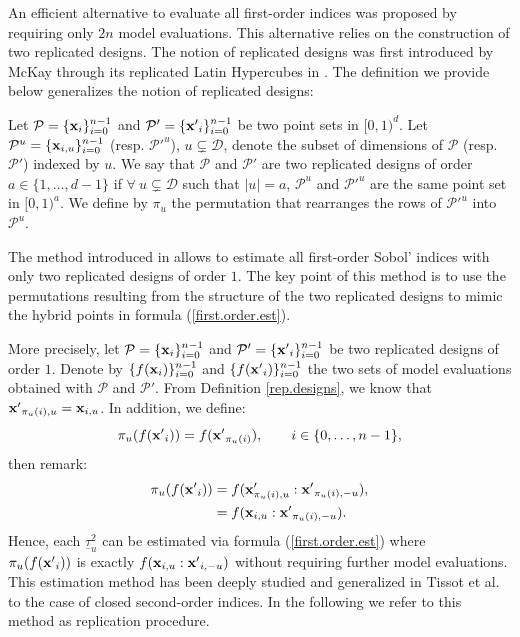 An efficient alternative to evaluate all first-order indices was proposed by \cite{Mara} requiring only $2n$ model evaluations. This alternative relies on the construction of two replicated designs. The notion of replicated designs was first introduced by McKay through its replicated Latin Hypercubes in \cite{McKay}. The definition we provide below generalizes the notion of replicated designs:
\begin{definition}
\label{rep.designs}
Let $\mathcal{P}=\{\boldsymbol{\mathbf{x}}_i\}_{i=0}^{n-1}$ and $\mathcal{P}'=\{{\boldsymbol{\mathbf{x}}'}_i\}_{i=0}^{n-1}$ be two point sets in
$[0,1)^{d}$. Let $\mathcal{P}^u=\{\boldsymbol{\mathbf{x}}_{i,u}\}_{i=0}^{n-1}$ (resp. ${\mathcal{P}'}^u$), $u \subsetneq \mathcal{D}$, denote the subset of dimensions of $\mathcal{P}$ (resp. $\mathcal{P}'$) indexed by $u$. We say that $\mathcal{P}$ and $\mathcal{P}'$ are two replicated designs of order $a \in \{1,\dots,d-1\}$ if $\forall \ u \subsetneq \mathcal{D}$ such that $|u|=a$, $\mathcal{P}^u$ and ${\mathcal{P}'}^u$ are the same point set in $[0,1)^a$. We define by $\pi_u$ the permutation that rearranges the rows of ${\mathcal{P}'}^u$ into $\mathcal{P}^u$.
\end{definition}
The method introduced in \cite{Mara} allows to estimate all first-order Sobol' indices with only two replicated designs of order $1$. The key point of this method is to use the permutations resulting from the structure of the two replicated designs to mimic the hybrid points in formula (\ref{first.order.est}). 

More precisely, let $\mathcal{P}=\{\boldsymbol{\mathbf{x}}_i\}_{i=0}^{n-1}$ and $\mathcal{P}'=\{{\boldsymbol{\mathbf{x}}'}_i\}_{i=0}^{n-1}$ be two replicated designs of order $1$. Denote by $\{f(\boldsymbol{\mathbf{x}}_i)\}_{i=0}^{n-1}$ and $\{f({\boldsymbol{\mathbf{x}}'}_i)\}_{i=0}^{n-1}$ the two sets of model evaluations obtained with $\mathcal{P}$ and $\mathcal{P}'$. From Definition \ref{rep.designs}, we know that ${\boldsymbol{\mathbf{x}}'}_{\pi_u(i),u}={\boldsymbol{\mathbf{x}}}_{i,u}$. In addition, we define:
\[\pi_u(f({\boldsymbol{\mathbf{x}}'}_i)) = f({\boldsymbol{\mathbf{x}}'}_{\pi_u(i)}), \qquad  i \in \{0,\dots,n-1\},\]
then remark:
\begin{align*}
\pi_u(f({\boldsymbol{\mathbf{x}}'}_i))&= f(\boldsymbol{\mathbf{x}}'_{\pi_u(i),u}:{\boldsymbol{\mathbf{x}}'}_{\pi_u(i),-u}), \\
&= f(\boldsymbol{\mathbf{x}}_{i,u}:{\boldsymbol{\mathbf{x}}'}_{\pi_u(i),-u}).
\end{align*}
Hence, each $\underline{\tau}^2_u$ can be estimated via formula (\ref{first.order.est}) where \\ $\pi_u(f({\boldsymbol{\mathbf{x}}'}_i))$ is exactly $f(\boldsymbol{\mathbf{x}}_{i,u}:{\boldsymbol{\mathbf{x}}'}_{i,-u})$ without requiring further model evaluations. This estimation method has been deeply studied and generalized in Tissot et al. \cite{Tissot} to the case of closed second-order indices. In the following we refer to this method as replication procedure.

